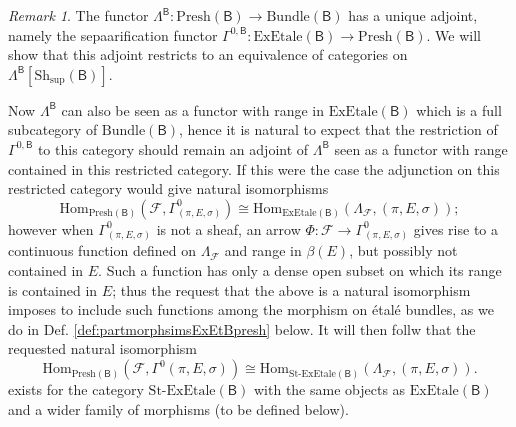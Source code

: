 \documentclass[11pt]{amsart}
\newcommand{\F}{\mathcal{F}}
\newcommand{\Presh}{\textrm{Presh}}
\newcommand{\Sh}{\textrm{Sh}}
\newcommand{\bundle}{\textrm{Bundle}}
\newcommand{\stexetale}{\textrm{St-ExEtale}}
\newcommand{\exetale}{\textrm{ExEtale}}
\theoremstyle{plain}
\theoremstyle{definition}
\theoremstyle{plain}
\theoremstyle{remark}
\newtheorem{remark}[theorem]{Remark}
\newcommand{\bool}[1]{\mathsf{#1}}
\newcommand{\0}{\mathsf{0}}
\renewcommand{\1}{\mathsf{1}}
\renewcommand{\2}{\mathsf{2}}
\theoremstyle{definition}
\begin{document}
\begin{remark}
The functor
$\Lambda^\bool{B}:\Presh(\bool{B})\to\bundle(\bool{B})$ has a unique adjoint, namely the sepaarification functor $\Gamma^{0, \bool{B}}:\exetale(\bool{B})\to\Presh(\bool{B})$. 
We will show that this adjoint  restricts to an equivalence of categories on $\Lambda^\bool{B}[\Sh_\mathrm{sup}(\bool{B})]$. 

Now $\Lambda^\bool{B}$ can also be seen as a functor with range in $\exetale(\bool{B})$ which is a full subcategory of $\bundle(\bool{B})$, hence it is natural to expect that 
the restriction of  $\Gamma^{0,\bool{B}}$ to this category should remain an adjoint of $\Lambda^\bool{B}$ seen as a functor with range contained in this restricted category.
If this were the case the adjunction on this restricted category would give natural isomorphisms
\[
\mathrm{Hom}_{\Presh(\bool{B})}(\F, \Gamma^0_{(\pi,E,\sigma)})\cong
\mathrm{Hom}_{\exetale(\bool{B})}(\Lambda_\F, (\pi,E,\sigma));
\]
however when $\Gamma^0_{(\pi,E,\sigma)}$ is not a sheaf, an arrow $\Phi:\F\to \Gamma^0_{(\pi,E,\sigma)}$ gives rise to a  continuous function defined on $\Lambda_\F$ and range in $\beta(E)$, but possibly not contained in $E$.
Such a function has only a dense open subset on which its range is contained in $E$; thus the request that the above is a natural isomorphism imposes to include such functions among the morphism on \'etal\'e bundles, as we do in Def. \ref{def:partmorphsimsExEtBpresh} below. It will then follw that the requested natural isomorphism 
\[
\mathrm{Hom}_{\Presh(\bool{B})}(\F, \Gamma^0(\pi,E,\sigma))\cong
\mathrm{Hom}_{\stexetale(\bool{B})}(\Lambda_\F, (\pi,E,\sigma)).
\]
exists for the category $\stexetale(\bool{B})$ with the same objects as $\exetale(\bool{B})$ and a wider family of morphisms (to be defined below).
\end{remark}
\end{document}
